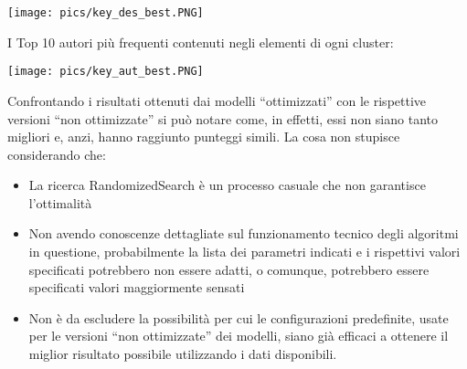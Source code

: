\documentclass[12pt,oneside]{article}
\begin{document}
        \texttt{[image: pics/key\_des\_best.PNG]}
        
        \begin{justify}
        I Top 10 autori più frequenti contenuti negli elementi di ogni cluster:
        \end{justify}
        
        \texttt{[image: pics/key\_aut\_best.PNG]}

        \begin{justify}
        Confrontando i risultati ottenuti dai modelli “ottimizzati” con le rispettive versioni “non ottimizzate” si può notare come, in effetti, essi non siano tanto migliori e, anzi, hanno raggiunto punteggi simili. La cosa non stupisce considerando che: 
        \begin{itemize}
            \item La ricerca RandomizedSearch è un processo casuale che non garantisce l’ottimalità
            \item Non avendo conoscenze dettagliate sul funzionamento tecnico degli algoritmi in questione, probabilmente la lista dei parametri indicati e i rispettivi valori specificati potrebbero non essere adatti, o comunque, potrebbero essere specificati valori maggiormente sensati
            \item Non è da escludere la possibilità per cui le configurazioni predefinite, usate per le versioni “non ottimizzate” dei modelli, siano già efficaci a ottenere il miglior risultato possibile utilizzando i dati disponibili.
        \end{itemize}
    \end{justify}
\end{document}
